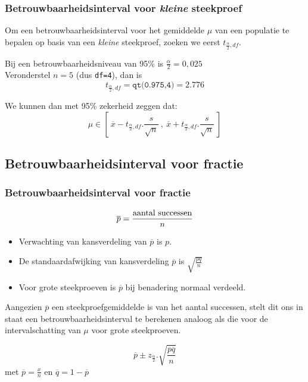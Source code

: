 \documentclass[aspectratio=169]{beamer}
\begin{document}
\begin{frame}
\frametitle{Betrouwbaarheidsinterval voor \textit{kleine} steekproef}
Om een betrouwbaarheidsinterval voor het gemiddelde $\mu$ van een populatie te bepalen op basis van een \textit{kleine} steekproef, zoeken we eerst $t_ {\frac{\alpha}{2},df}$.

\vfill
Bij een betrouwbaarheidsniveau van 95\% is $\frac{\alpha}{2}=0,025$\\
Veronderstel $n=5$ (dus \texttt{df=4}), dan is
\[ t_ {\frac{\alpha}{2},df} = \texttt{qt(0.975,4)} = 2.776 \]

\vfill
We kunnen dan met 95\% zekerheid zeggen dat:
\[ \mu \in \left[~ \overline{x} - t_{\frac{\alpha}{2},df}.\frac{s}{\sqrt{n}} ~,~ \overline{x} + t_{\frac{\alpha}{2},df}.\frac{s}{\sqrt{n}} ~\right] \]

\end{frame}


\subsection{Betrouwbaarheidsinterval voor fractie}
\begin{frame}
  \frametitle{Betrouwbaarheidsinterval voor fractie}
  \[ \overline{p} = \frac{\textnormal{aantal successen}}{n} \]
  \begin{itemize}
  \item Verwachting van kansverdeling van $\overline{p}$ is $p$.
  \item De standaardafwijking van kansverdeling $\overline{p}$ is $\sqrt{\frac{pq}{n}}$
  \item Voor grote steekproeven is $\overline{p}$ bij benadering normaal verdeeld.
\end{itemize}
Aangezien $\overline{p}$ een steekproefgemiddelde is van het aantal successen, stelt dit ons in staat een betrouwbaarheidsinterval te berekenen analoog als die voor de intervalschatting van $\mu$ voor grote steekproeven.


  \[ \overline{p} \pm z_{\frac{\alpha}{2}}.\sqrt{\frac{\overline{p}\overline{q}}{n}} \]
  met $\overline{p} = \frac{x}{n}$ en $\overline{q} = 1- \overline{p}$

\end{frame}
\end{document}
